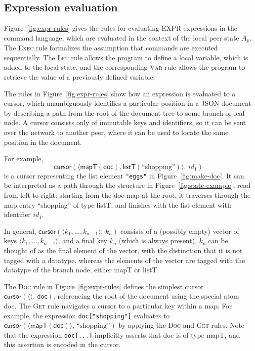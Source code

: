 \documentclass[10pt,journal,compsoc]{IEEEtran}
\begin{document}
\subsection{Expression evaluation}

Figure~\ref{fig:expr-rules} gives the rules for evaluating EXPR expressions in the command language, which are evaluated in the context of the local peer state $A_p$. The \textsc{Exec} rule formalizes the assumption that commands are executed sequentially. The \textsc{Let} rule allows the program to define a local variable, which is added to the local state, and the corresponding \textsc{Var} rule allows the program to retrieve the value of a previously defined variable.

The rules in Figure~\ref{fig:expr-rules} show how an expression is evaluated to a cursor, which unambiguously identifies a particular position in a JSON document by describing a path from the root of the document tree to some branch or leaf node. A cursor consists only of immutable keys and identifiers, so it can be sent over the network to another peer, where it can be used to locate the same position in the document.

For example,
\[ \mathsf{cursor}(\langle \mathsf{mapT}(\mathsf{doc}), \mathsf{listT}(\text{``shopping''}) \rangle,\, \mathit{id}_1) \]
is a cursor representing the list element \verb|"eggs"| in Figure~\ref{fig:make-doc}. It can be interpreted as a path through the structure in Figure~\ref{fig:state-example}, read from left to right: starting from the \textsf{doc} map at the root, it traverses through the map entry ``shopping'' of type \textsf{listT}, and finishes with the list element with identifier $\mathit{id}_1$.

In general, $\mathsf{cursor}(\langle k_1, \dots, k_{n-1} \rangle,\, k_n)$ consists of a (possibly empty) vector of keys $\langle k_1, \dots, k_{n-1} \rangle$, and a final key $k_n$ (which is always present). $k_n$ can be thought of as the final element of the vector, with the distinction that it is not tagged with a datatype, whereas the elements of the vector are tagged with the datatype of the branch node, either \textsf{mapT} or \textsf{listT}.

The \textsc{Doc} rule in Figure~\ref{fig:expr-rules} defines the simplest cursor $\mathsf{cursor}(\langle\rangle,\, \mathsf{doc})$, referencing the root of the document using the special atom \textsf{doc}. The \textsc{Get} rule navigates a cursor to a particular key within a map. For example, the expression \verb|doc["shopping"]| evaluates to $\mathsf{cursor}(\langle \mathsf{mapT}(\mathsf{doc}) \rangle,\, \text{``shopping''})$ by applying the \textsc{Doc} and \textsc{Get} rules. Note that the expression \verb|doc[...]| implicitly asserts that \textsf{doc} is of type \textsf{mapT}, and this assertion is encoded in the cursor.
\end{document}
